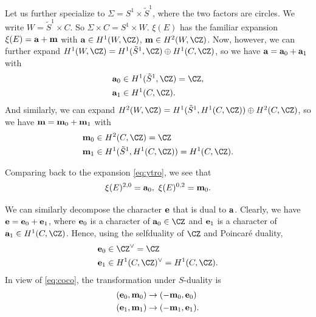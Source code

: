 Let us further specialize to $\Sigma=S^1\times \tilde S^1$, where
the two factors are circles. We write $W=\tilde S^1\times C$. So
$\Sigma\times C=S^1\times W$. $\xi(E)$ has the familiar expansion
$\xi(E)={\bf a}+{\bf m}$ with ${\bf a}\in H^1(W,\CZ)$, ${\bf m}\in
H^2(W,\CZ)$. Now, however, we can further expand
$H^1(W,\CZ)=H^1(\tilde S^1,\CZ)\oplus H^1(C,\CZ)$, so we have
${\bf a}={\bf a}_0+{\bf a}_1$ with %
\setcounter{equation}{19}
\begin{equation}\label{eq:mimot}
\begin{aligned}{\bf
a}_0&\in H^1(\tilde S^1,\CZ) =\CZ,\\ {\bf a}_1& \in
H^1(C,\CZ).\\\end{aligned}
\end{equation}
 And similarly, we can expand
$H^2(W,\CZ)=H^1(\tilde S^1,H^1(C,\CZ))\oplus H^2(C,\CZ)$, so we
have ${\bf m}={\bf m}_0+{\bf m}_1$ with %
\setcounter{equation}{20}
\begin{equation}\label{eq:nimot}
\begin{aligned}{\bf
m}_0&\in H^2(C,\CZ)=\CZ \\
                     {\bf m}_1&\in
                     H^1(\tilde S^1,H^1(C,\CZ))=H^1(C,\CZ).\\\end{aligned}
\end{equation}

Comparing back to the expansion \eqref{eq:ytro}, we see that
\setcounter{equation}{21}
\begin{equation}\label{eq:zimot}
\xi(E)^{2,0}={\bf a}_0,~\xi(E)^{0,2}={\bf m}_0.
\end{equation}

We can similarly decompose the character $\bf e$ that is dual to
$\bf a$. Clearly, we have ${\bf e}={\bf e}_0+{\bf e}_1$, where
${\bf e}_0$ is a character of ${\bf a}_0\in \CZ$ and ${\bf e}_1$
is a character of ${\bf a}_1\in H^1(C,\CZ)$.  Hence, using
 the selfduality of $\CZ$ and Poincar\'e duality, %
\setcounter{equation}{22}
\begin{equation}\label{eq:tew}
\begin{aligned} {\bf e}_0 & \in
\CZ^\vee=\CZ\\ {\bf e}_1&\in H^1(C,\CZ)^\vee=H^1(C,\CZ).\\\end{aligned}
\end{equation}
 In
view of \eqref{eq:coco}, the transformation under $S$-duality is
\setcounter{equation}{23}
\begin{equation}\label{eq:niko}
\begin{aligned}({\bf e}_0,{\bf m}_0)&\to (-{\bf m}_0,{\bf
e}_0)\\ ({\bf e}_1,{\bf m}_1)&\to (-{\bf m}_1,{\bf e}_1).\\\end{aligned}
\end{equation}


